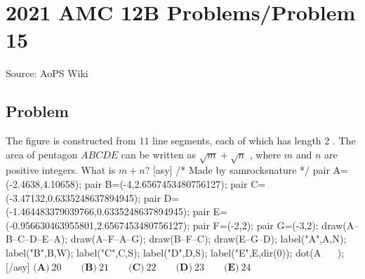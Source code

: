 \documentclass[12pt]{article}
\begin{document}
\section*{{2021 AMC 12B Problems/Problem 15}}
Source: AoPS Wiki

\subsection*{Problem}
The figure is constructed from $11$ line segments, each of which has length $2$ . The area of pentagon $ABCDE$ can be written as $\sqrt{m} + \sqrt{n}$ , where $m$ and $n$ are positive integers. What is $m + n ?$ [asy] /* Made by samrocksnature */ pair A=(-2.4638,4.10658); pair B=(-4,2.6567453480756127); pair C=(-3.47132,0.6335248637894945); pair D=(-1.464483379039766,0.6335248637894945); pair E=(-0.956630463955801,2.6567453480756127); pair F=(-2,2); pair G=(-3,2); draw(A--B--C--D--E--A); draw(A--F--A--G); draw(B--F--C); draw(E--G--D); label("A",A,N); label("B",B,W); label("C",C,S); label("D",D,S); label("E",E,dir(0)); dot(A^^B^^C^^D^^E^^F^^G); [/asy] $\textbf{(A)} ~20 \qquad\textbf{(B)} ~21 \qquad\textbf{(C)} ~22 \qquad\textbf{(D)} ~23 \qquad\textbf{(E)} ~24$
\end{document}
